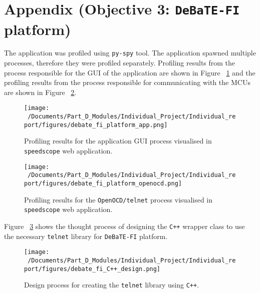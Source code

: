 \newpage
\section{Appendix (Objective 3: \texttt{DeBaTE-FI} platform)}
\label{sec:app_obj3}

The application was profiled using \texttt{py-spy} tool. The application spawned multiple processes, therefore they were profiled separately. Profiling results from the process responsible for the GUI of the application are shown in Figure ~\ref{fig:debate_profile_1} and the profiling results from the process responsible for communicating with the MCUs are shown in Figure ~\ref{fig:debate_profile_2}.

\begin{figure}[H] %
	\centering
	\texttt{[image: ~/Documents/Part\_D\_Modules/Individual\_Project/Individual\_report/figures/debate\_fi\_platform\_app.png]} %
	\caption{Profiling results for the application GUI process visualised in \texttt{speedscope} web application\cite{speedscope_app}. }
	\label{fig:debate_profile_1} %
\end{figure}

\begin{figure}[H] %
	\centering
	\texttt{[image: ~/Documents/Part\_D\_Modules/Individual\_Project/Individual\_report/figures/debate\_fi\_platform\_openocd.png]} %
	\caption{Profiling results for the \texttt{OpenOCD/telnet} process visualised in \texttt{speedscope} web application\cite{speedscope_app}.}
	\label{fig:debate_profile_2} %
\end{figure}

Figure ~\ref{fig:debate_fi_telnetlibcpp} shows the thought process of designing the \texttt{C++} wrapper class to use the necessary \texttt{telnet} library for \texttt{DeBaTE-FI} platform. 

\begin{figure}[H] %
	\centering
	\texttt{[image: ~/Documents/Part\_D\_Modules/Individual\_Project/Individual\_report/figures/debate\_fi\_C++\_design.png]} %
	\caption{Design process for creating the \texttt{telnet} library using \texttt{C++}.}
	\label{fig:debate_fi_telnetlibcpp} %
\end{figure}

